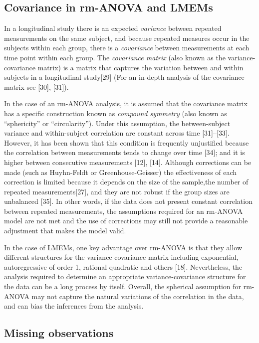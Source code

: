 \documentclass[
]{article}
\begin{document}
\hypertarget{covariance-in-rm-anova-and-lmems}{%
\subsection{Covariance in rm-ANOVA and LMEMs}\label{covariance-in-rm-anova-and-lmems}}

In a longitudinal study there is an expected \emph{variance} between repeated measurements on the same subject, and because repeated measures occur in the subjects within each group, there is a \emph{covariance} between measurements at each time point within each group. The \emph{covariance matrix} (also known as the variance-covariance matrix) is a matrix that captures the variation between and within subjects in a longitudinal study{[}29{]} (For an in-depth analysis of the covariance matrix see {[}30{]}, {[}31{]}).

In the case of an rm-ANOVA analysis, it is assumed that the covariance matrix has a specific construction known as \emph{compound symmetry} (also known as ``sphericity'' or ``circularity''). Under this assumption, the between-subject variance and within-subject correlation are constant across time {[}31{]}--{[}33{]}. However, it has been shown that this condition is frequently unjustified because the correlation between measurements tends to change over time {[}34{]}; and it is higher between consecutive measurements {[}12{]}, {[}14{]}. Although corrections can be made (such as Huyhn-Feldt or Greenhouse-Geisser) the effectiveness of each correction is limited because it depends on the size of the sample,the number of repeated measurements{[}27{]}, and they are not robust if the group sizes are unbalanced {[}35{]}. In other words, if the data does not present constant correlation between repeated measurements, the assumptions required for an rm-ANOVA model are not met and the use of corrections may still not provide a reasonable adjustment that makes the model valid.

In the case of LMEMs, one key advantage over rm-ANOVA is that they allow different structures for the variance-covariance matrix including exponential, autoregressive of order 1, rational quadratic and others {[}18{]}. Nevertheless, the analysis required to determine an appropriate variance-covariance structure for the data can be a long process by itself. Overall, the spherical assumption for rm-ANOVA may not capture the natural variations of the correlation in the data, and can bias the inferences from the analysis.

\hypertarget{missing-observations}{%
\subsection{Missing observations}\label{missing-observations}}
\end{document}
